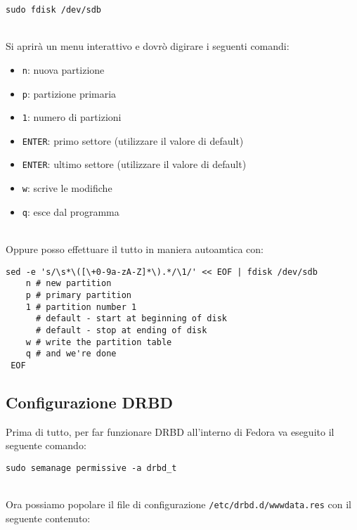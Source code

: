 \begin{lstlisting}[style=cmd]
 sudo fdisk /dev/sdb
\end{lstlisting}
\ \\
Si aprir\`{a} un menu interattivo e dovr\`{o} digirare i seguenti comandi:

\begin{itemize}
	\item \lstinline[style=cmd]|n|: nuova partizione
	\item \lstinline[style=cmd]|p|: partizione primaria
	\item \lstinline[style=cmd]|1|: numero di partizioni
	\item \lstinline[style=cmd]|ENTER|: primo settore (utilizzare il valore di default)
	\item \lstinline[style=cmd]|ENTER|: ultimo settore (utilizzare il valore di default)
	\item \lstinline[style=cmd]|w|: scrive le modifiche
	\item \lstinline[style=cmd]|q|: esce dal programma
\end{itemize}
\ \\
Oppure posso effettuare il tutto in maniera autoamtica con:

\begin{lstlisting}[style=cmd]
 sed -e 's/\s*\([\+0-9a-zA-Z]*\).*/\1/' << EOF | fdisk /dev/sdb
    n # new partition
    p # primary partition
    1 # partition number 1
      # default - start at beginning of disk 
      # default - stop at ending of disk 
    w # write the partition table
    q # and we're done
 EOF
\end{lstlisting}

\subsection{Configurazione DRBD}

Prima di tutto, per far funzionare DRBD all'interno di Fedora va eseguito il seguente comando:

\begin{lstlisting}[style=cmd]
 sudo semanage permissive -a drbd_t
\end{lstlisting}
\ \\
Ora possiamo popolare il file di configurazione \lstinline[style=cmd]|/etc/drbd.d/wwwdata.res| con il seguente contenuto:

